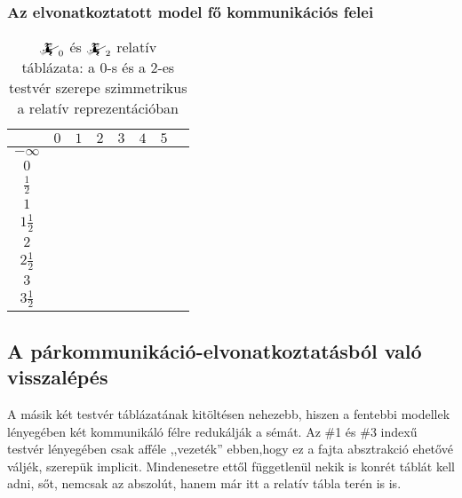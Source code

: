 \documentclass{article}
\newcommand{\blk}{\cellcolor{darkgray}}
\newcommand{\red}{\cellcolor{red!33}}
\newcommand{\grn}{\cellcolor{green!33}}
\newcommand{\nothing}{\text{\raisebox{0.4em}{\rotatebox{180}{$\curvearrowleft$}}}}%
\newcommand{\just}[1]{\boxed{#1}}%
\newcommand{\incl}{\mathbf{incl}}
\newcommand{\excl}{\mathbf{excl}}
\newcommand{\currymainfun}[1]{\mathwitch_{#1}}
\begin{document}
	\subsubsection{Az elvonatkoztatott model fő kommunikációs felei}

	\begin{table}[H]
		\caption*{$\currymainfun0$ és $\currymainfun2$ relatív táblázata: a 0-s és a 2-es testvér szerepe szimmetrikus a relatív reprezentációban}
		\centering
		\begin{tabular}{c||c|c|c|c|c|c|c|}
				&	$0$		&	$1$		&	$2$		&	$3$		&	$4$		&	$5$		\\\hline\hline
		$-\infty$	&	\nothing	&	\nothing	&	\nothing	&	\nothing	&	\nothing	&	\nothing	\\\hline
			$0$	&	\nothing	&	\nothing	&	\nothing	&	\nothing	&	\nothing	&	\grn\just\incl	\\\hline
		$\frac12$	&	\red\just\excl	&	\nothing	&	\nothing	&	\nothing	&	\nothing	&	\grn\just\incl	\\\hline
			$1$	&	\red\just\excl	&	\nothing	&	\nothing	&	\nothing	&	\grn\just\incl	&	\blk		\\\hline
		$1\frac12$	&	\blk		&	\red\just\excl	&	\nothing	&	\nothing	&	\grn\just\incl	&	\blk		\\\hline
			$2$	&	\blk		&	\red\just\excl	&	\nothing	&	\grn\just\incl	&	\blk		&	\blk		\\\hline
		$2\frac12$	&	\blk		&	\blk		&	\red\just\excl	&	\grn\just\incl	&	\blk		&	\blk		\\\hline
			$3$	&	\blk		&	\blk		&	\blk		&	\blk		&	\blk		&	\blk		\\\hline
		$3\frac12$	&	\blk		&	\blk		&	\blk		&	\blk		&	\blk		&	\blk		\\\hline
		\end{tabular}
	\end{table}

	\subsection{A párkommunikáció-elvonatkoztatásból való visszalépés}

	A másik két testvér táblázatának kitöltésen nehezebb, hiszen a fentebbi modellek lényegében két kommunikáló félre redukálják a sémát.
	Az \#1 és \#3 indexű testvér lényegében csak afféle ,,vezeték'' ebben,hogy ez a fajta absztrakció ehetővé váljék, szerepük implicit.
	Mindenesetre ettől függetlenül nekik is konrét táblát kell adni, sőt, nemcsak az abszolút, hanem már itt a relatív tábla terén is is.
\end{document}
